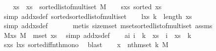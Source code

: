 \begin{isabellebody}
\ \ \isamarkupfalse%
\ xs\ \ {\isachardoublequoteopen}xs\ {\isacharequal}{\kern0pt}\ sorted{\isacharunderscore}{\kern0pt}list{\isacharunderscore}{\kern0pt}of{\isacharunderscore}{\kern0pt}multiset\ M{\isachardoublequoteclose}\isanewline
\ \ \isamarkupfalse%
\ s{\isacharunderscore}{\kern0pt}xs{\isacharcolon}{\kern0pt}\ {\isachardoublequoteopen}sorted\ xs{\isachardoublequoteclose}\ \isamarkupfalse%
\ {\isacharparenleft}{\kern0pt}simp\ add{\isacharcolon}{\kern0pt}xs{\isacharunderscore}{\kern0pt}def\ sorted{\isacharunderscore}{\kern0pt}sorted{\isacharunderscore}{\kern0pt}list{\isacharunderscore}{\kern0pt}of{\isacharunderscore}{\kern0pt}multiset{\isacharparenright}{\kern0pt}\isanewline
\ \ \isamarkupfalse%
\ l{\isacharunderscore}{\kern0pt}xs{\isacharcolon}{\kern0pt}\ {\isachardoublequoteopen}k\ {\isacharless}{\kern0pt}\ length\ xs{\isachardoublequoteclose}\ \isamarkupfalse%
\ {\isacharparenleft}{\kern0pt}simp\ add{\isacharcolon}{\kern0pt}xs{\isacharunderscore}{\kern0pt}def{\isacharparenright}{\kern0pt}\ \isanewline
\ \ \ \ \isamarkupfalse%
\ {\isacharparenleft}{\kern0pt}metis\ size{\isacharunderscore}{\kern0pt}mset\ mset{\isacharunderscore}{\kern0pt}sorted{\isacharunderscore}{\kern0pt}list{\isacharunderscore}{\kern0pt}of{\isacharunderscore}{\kern0pt}multiset\ assms{\isacharparenleft}{\kern0pt}{}{\isacharparenright}{\kern0pt}{\isacharparenright}{\kern0pt}\ \ \isanewline
\ \ \isamarkupfalse%
\ M{\isacharunderscore}{\kern0pt}xs{\isacharcolon}{\kern0pt}\ {\isachardoublequoteopen}M\ {\isacharequal}{\kern0pt}\ mset\ xs{\isachardoublequoteclose}\ \isamarkupfalse%
\ {\isacharparenleft}{\kern0pt}simp\ add{\isacharcolon}{\kern0pt}xs{\isacharunderscore}{\kern0pt}def{\isacharparenright}{\kern0pt}\isanewline
\ \ \isamarkupfalse%
\ a{\isacharcolon}{\kern0pt}{\isachardoublequoteopen}{\isasymAnd}i{\isachardot}{\kern0pt}\ i\ {\isasymle}\ k\ {\isasymLongrightarrow}\ xs\ {\isacharbang}{\kern0pt}\ i\ {\isasymle}\ xs\ {\isacharbang}{\kern0pt}\ k{\isachardoublequoteclose}\isanewline
\ \ \ \ \isamarkupfalse%
\ s{\isacharunderscore}{\kern0pt}xs\ l{\isacharunderscore}{\kern0pt}xs\ sorted{\isacharunderscore}{\kern0pt}iff{\isacharunderscore}{\kern0pt}nth{\isacharunderscore}{\kern0pt}mono\ \isamarkupfalse%
\ blast\isanewline
\isanewline
\ \ \isamarkupfalse%
\ {\isachardoublequoteopen}{\isasymnot}{\isacharparenleft}{\kern0pt}x\ {\isasymle}\ nth{\isacharunderscore}{\kern0pt}mset\ k\ M{\isacharparenright}{\kern0pt}{\isachardoublequoteclose}\isanewline

\end{isabellebody}
